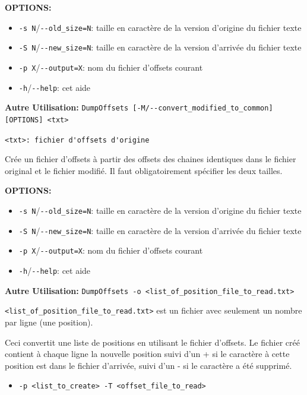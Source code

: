 \bigskip
\noindent \textbf{OPTIONS:}
	  	 
\begin{itemize} 	 
  \item \verb+-s N+/\verb+--old_size=N+: taille en caractère de la version d'origine du fichier texte
  \item \verb+-S N+/\verb+--new_size=N+: taille en caractère de la version d'arrivée du fichier texte
  \item \verb+-p X+/\verb+--output=X+: nom du fichier d'offsets courant	 
  \item \verb+-h+/\verb+--help+: cet aide
\end{itemize} 	 

\bigskip
\noindent \textbf{Autre Utilisation:} \verb+DumpOffsets [-M/--convert_modified_to_common] [OPTIONS] <txt>+

\bigskip
\noindent \verb+<txt>: fichier d'offsets d'origine+

\bigskip
\noindent Crée un fichier d'offsets à partir des offsets des chaines identiques dans le fichier original et le fichier modifié.
Il faut obligatoirement spécifier les deux tailles.
	
\bigskip
\noindent \textbf{OPTIONS:}
	  	 
\begin{itemize} 	 
  \item \verb+-s N+/\verb+--old_size=N+: taille en caractère de la version d'origine du fichier texte
  \item \verb+-S N+/\verb+--new_size=N+: taille en caractère de la version d'arrivée du fichier texte
  \item \verb+-p X+/\verb+--output=X+: nom du fichier d'offsets courant	 
  \item \verb+-h+/\verb+--help+: cet aide	 
\end{itemize} 	 

\bigskip
\noindent \textbf{Autre Utilisation:} \verb+DumpOffsets -o <list_of_position_file_to_read.txt>+

\bigskip
\noindent \verb+<list_of_position_file_to_read.txt>+ est un fichier avec seulement un nombre par ligne (une position).

\bigskip
\noindent Ceci convertit une liste de positions en utilisant le fichier d'offsets.
	  Le fichier créé contient à chaque ligne la nouvelle position suivi d'un +  si le caractère à cette position 
	  est dans le fichier d'arrivée, suivi d'un - si le caractère a été supprimé.
	  	 
\begin{itemize}
  \item \verb+-p <list_to_create> -T <offset_file_to_read>+
\end{itemize} 	 

